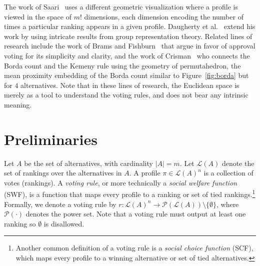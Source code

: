 \documentclass[prodmode,acmec]{ec-acmsmall}
\newcommand{\calL}{{\mathcal{L}}}
\newcommand{\rank}{{\calL(A)}}
\newcommand{\calP}{{\mathcal{P}}}
\begin{document}
The work of Saari~ uses a different geometric visualization where a profile is viewed in the space of $m!$ dimensions, each dimension encoding the number of times a particular ranking appears in a given profile. Daugherty et al.~ extend his work by using intricate results from group representation theory. Related lines of research include the work of Brams and Fishburn~ that argue in favor of approval voting for its simplicity and clarity, and the work of Crisman~ who connects the Borda count and the Kemeny rule using the geometry of permutahedron, the mean proximity embedding of the Borda count similar to Figure~\ref{fig:borda} but for $4$ alternatives. Note that in these lines of research, the Euclidean space is merely as a tool to understand the voting rules, and does not bear any intrinsic meaning.


\section{Preliminaries}
\label{sec:prelim}
Let $A$ be the set of alternatives, with cardinality $|A| = m$. Let $\rank$ denote the set of rankings over the alternatives in $A$. A profile $\pi \in \rank^n$ is a collection of votes (rankings). A \emph{voting rule}, or more technically a \emph{social welfare function} (SWF), is a function that maps every profile to a ranking or set of tied rankings.\footnote{Another common definition of a voting rule is a \emph{social choice function} (SCF), which maps every profile to a winning alternative or set of tied alternatives.} Formally, we denote a voting rule by $r : \rank^n \rightarrow \calP(\rank)\setminus\{\emptyset\}$, where $\calP(\cdot)$ denotes the power set. Note that a voting rule must output at least one ranking so $\emptyset$ is disallowed. \\

\end{document}
